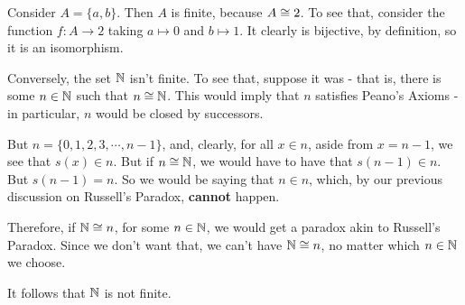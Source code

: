 \begin{ex}
	Consider $A=\{a,b\}$. Then $A$ is finite, because $A\cong 2$. To see that, consider the function $f:A\to 2$ taking $a\mapsto 0$ and $b\mapsto 1$. It clearly is bijective, by definition, so it is an isomorphism.
	
	\bigskip
	Conversely, the set $\mathbb N$ isn't finite. To see that, suppose it was - that is, there is some $n\in \mathbb N$ such that $n\cong \mathbb N$. This would imply that $n$ satisfies Peano's Axioms - in particular, $n$ would be closed by successors.
	
	But $n=\{0,1,2,3,\cdots,n-1\}$, and, clearly, for all $x\in n$, aside from $x=n-1$, we see that $s(x)\in n$. But if $n\cong \mathbb N$, we would have to have that $s(n-1)\in n$. But $s(n-1)=n$. So we would be saying that $n\in n$, which, by our previous discussion on Russell's Paradox, \textbf{cannot} happen.
	
	Therefore, if $\mathbb N\cong n$, for some $n\in \mathbb N$, we would get a paradox akin to Russell's Paradox. Since we don't want that, we can't have $\mathbb N\cong n$, no matter which $n\in \mathbb N$ we choose.
	
	It follows that $\mathbb N$ is not finite.
\end{ex}

